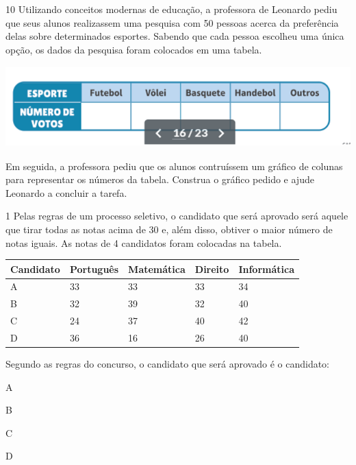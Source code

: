 


\num{10} Utilizando conceitos modernas de educação, a professora de Leonardo
pediu que seus alunos realizassem uma pesquisa com 50 pessoas acerca da
preferência delas sobre determinados esportes. Sabendo que cada pessoa
escolheu uma única opção, os dados da pesquisa foram colocados em uma tabela.


\includegraphics[width=5.39213in,height=1.22511in]{./media/image100.png}

Em seguida, a professora pediu que os alunos contruíssem um gráfico de
colunas para representar os números da tabela. Construa o gráfico pedido
e ajude Leonardo a concluir a tarefa.



\num{1} Pelas regras de um processo seletivo, o candidato que será aprovado será
aquele que tirar todas as notas acima de 30 e, além disso, obtiver o maior
número de notas iguais. As notas de 4 candidatos foram colocadas na
tabela.

\begin{longtable}[]{@{}lllll@{}}
\toprule
Candidato & Português & Matemática & Direito &
Informática\tabularnewline
\midrule
\endhead
A & 33 & 33 & 33 & 34\tabularnewline
B & 32 & 39 & 32 & 40\tabularnewline
C & 24 & 37 & 40 & 42\tabularnewline
D & 36 & 16 & 26 & 40\tabularnewline
\bottomrule
\end{longtable}

Segundo as regras do concurso, o candidato que será aprovado é o
candidato:

\begin{escolha}
\item
  A
\item
  B
\item
  C
\item
  D
\end{escolha}

